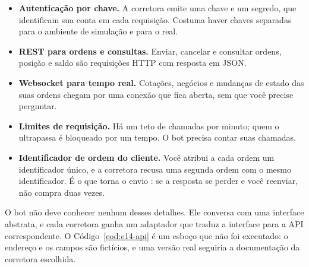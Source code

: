 \begin{itemize}
  \item \textbf{Autenticação por chave.} A corretora emite uma chave e um segredo, que identificam sua conta em cada requisição. Costuma haver chaves separadas para o ambiente de simulação e para o real.
  \item \textbf{REST para ordens e consultas.} Enviar, cancelar e consultar ordens, posição e saldo são requisições HTTP com resposta em JSON.
  \item \textbf{Websocket para tempo real.} Cotações, negócios e mudanças de estado das suas ordens chegam por uma conexão que fica aberta, sem que você precise perguntar.
  \item \textbf{Limites de requisição.} Há um teto de chamadas por minuto; quem o ultrapassa é bloqueado por um tempo. O bot precisa contar suas chamadas.
  \item \textbf{Identificador de ordem do cliente.} Você atribui a cada ordem um identificador único, e a corretora recusa uma segunda ordem com o mesmo identificador. É o que torna o envio : se a resposta se perder e você reenviar, não compra duas vezes.
\end{itemize}

O bot não deve conhecer nenhum desses detalhes. Ele conversa com uma interface abstrata, e cada corretora ganha um adaptador que traduz a interface para a API correspondente. O Código~\ref{cod:c14-api} é um esboço que não foi executado: o endereço e os campos são fictícios, e uma versão real seguiria a documentação da corretora escolhida.

